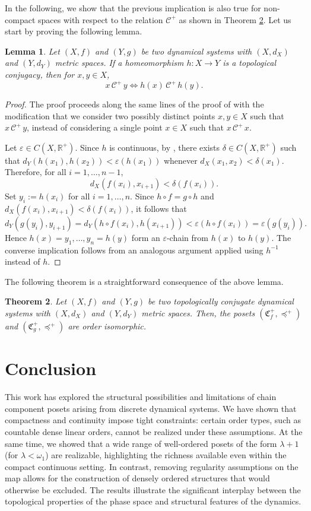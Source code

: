 \documentclass[pdflatex,sn-mathphys-num]{sn-jnl}
\theoremstyle{thmstyleone}%
\newtheorem{thm}{Theorem}
\newtheorem{lem}[thm]{Lemma}
\theoremstyle{thmstyletwo}%
\theoremstyle{thmstylethree}%
\begin{document}
\noindent In the following, we show that the previous implication is also true for non-compact spaces with respect to the relation $\mathcal{C}^+$ as shown in Theorem \ref{th_conj}. Let us start by proving the following lemma.
\begin{lem}\label{lem_conj}
    Let $(X,f)$ and $(Y,g)$ be two dynamical systems with $(X,d_X)$ and $(Y,d_Y)$ metric spaces. If a homeomorphism $h:X\rightarrow Y$ is a topological conjugacy, then for $x,y\in X$,
    $$x\,\mathcal{C}^+\, y \iff h(x)\,\mathcal{C}^+\, h(y).$$
\end{lem}
\begin{proof}
The proof proceeds along the same lines of the proof of \cite[Theorem 2.7]{kumarlal21} with the modification that we consider two possibly distinct points $x,y\in X$ such that $x\,\mathcal{C}^+\, y$, instead of considering a single point $x\in X$ such that $x\,\mathcal{C}^+\, x$. 

\noindent Let $\varepsilon\in C(X,\mathbb{R}^+)$. Since $h$ is continuous, by \cite[Lemma 2.3]{kumarlal21}, there exists $\delta\in C(X,\mathbb{R}^+)$ such that $d_Y(h(x_1),h(x_2))<\varepsilon(h(x_1))$ whenever $d_X(x_1,x_2)<\delta(x_1)$. Therefore, for all $i=1,\ldots,n-1$, $$d_X(f(x_i),x_{i+1})<\delta(f(x_i)).$$ Set $y_i:=h(x_i)$ for all $i=1,\ldots,n$. Since $h\circ f=g\circ h$ and $d_X(f(x_i),x_{i+1})<\delta(f(x_i))$, it follows that $$d_Y(g(y_i),y_{i+1})=d_Y(h\circ f(x_i),h(x_{i+1}))<\varepsilon(h\circ f(x_i))=\varepsilon(g(y_i)).$$
Hence $h(x)=y_1,\ldots,y_n=h(y)$ form an $\varepsilon$-chain from $h(x)$ to $h(y)$. The converse implication follows from an analogous argument applied using $h^{-1}$ instead of $h$.
\end{proof}
\noindent The following theorem is a straightforward consequence of the above lemma.
\begin{thm}\label{th_conj}
Let $(X,f)$ and $(Y,g)$ be two topologically conjugate dynamical systems with $(X,d_X)$ and $(Y,d_Y)$ metric spaces. Then, the posets $(\mathfrak{C}^+_f,\preceq^+)$ and $(\mathfrak{C}^+_g,\preceq^+)$ are order isomorphic.
\end{thm}

\section*{Conclusion}

This work has explored the structural possibilities and limitations of chain component posets arising from discrete dynamical systems. We have shown that compactness and continuity impose tight constraints: certain order types, such as countable dense linear orders, cannot be realized under these assumptions. At the same time, we showed that a wide range of well-ordered posets of the form \(\lambda + 1\) (for \(\lambda < \omega_1\)) are realizable, highlighting the richness available even within the compact continuous setting. In contrast, removing regularity assumptions on the map allows for the construction of densely ordered structures that would otherwise be excluded.
The results illustrate the significant interplay between the topological properties of the phase space and structural features of the dynamics.
\end{document}
